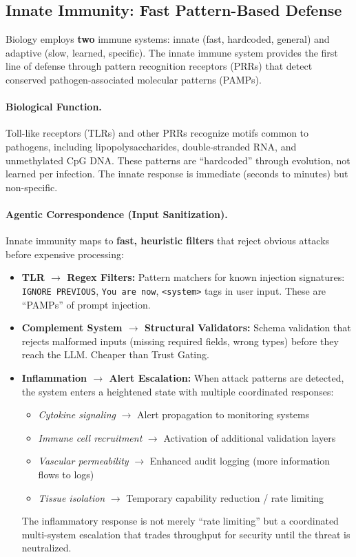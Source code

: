 \subsection{Innate Immunity: Fast Pattern-Based Defense}

Biology employs \textbf{two} immune systems: innate (fast, hardcoded, general) and adaptive (slow, learned,
specific). The innate immune system provides the first line of defense through pattern recognition receptors
(PRRs) that detect conserved pathogen-associated molecular patterns (PAMPs).

\paragraph{Biological Function.}
Toll-like receptors (TLRs) and other PRRs recognize motifs common to pathogens, including lipopolysaccharides,
double-stranded RNA, and unmethylated CpG DNA. These patterns are ``hardcoded'' through evolution, not learned per
infection. The innate response is immediate (seconds to minutes) but non-specific.

\paragraph{Agentic Correspondence (Input Sanitization).}
Innate immunity maps to \textbf{fast, heuristic filters} that reject obvious attacks before expensive processing:
\begin{itemize}[leftmargin=*]
\item \textbf{TLR $\to$ Regex Filters:} Pattern matchers for known injection signatures: \texttt{IGNORE PREVIOUS},
\texttt{You are now}, \texttt{<system>} tags in user input. These are ``PAMPs'' of prompt injection.
\item \textbf{Complement System $\to$ Structural Validators:} Schema validation that rejects malformed inputs
(missing required fields, wrong types) before they reach the LLM. Cheaper than Trust Gating.
\item \textbf{Inflammation $\to$ Alert Escalation:} When attack patterns are detected, the system
enters a heightened state with multiple coordinated responses:
\begin{itemize}
\item \textit{Cytokine signaling} $\to$ Alert propagation to monitoring systems
\item \textit{Immune cell recruitment} $\to$ Activation of additional validation layers
\item \textit{Vascular permeability} $\to$ Enhanced audit logging (more information flows to logs)
\item \textit{Tissue isolation} $\to$ Temporary capability reduction / rate limiting
\end{itemize}
The inflammatory response is not merely ``rate limiting'' but a coordinated multi-system escalation
that trades throughput for security until the threat is neutralized.
\end{itemize}

